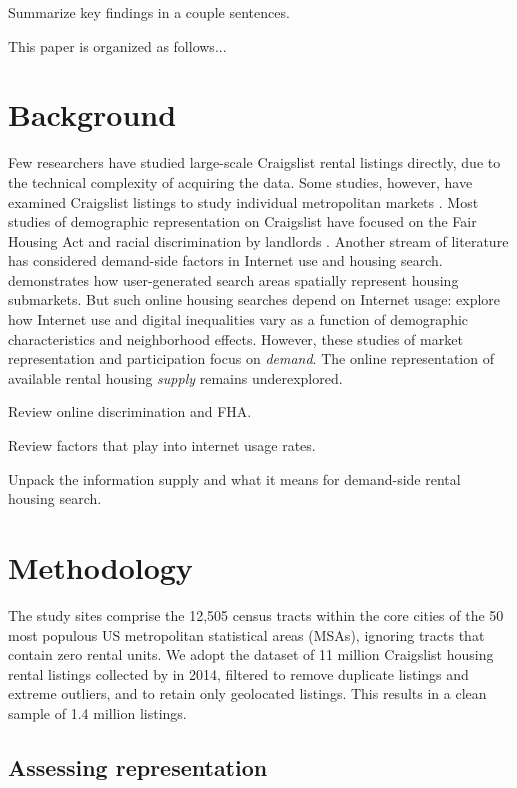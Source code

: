 \documentclass[12pt,onecolumn]{article} %
\begin{document}
Summarize key findings in a couple sentences.

This paper is organized as follows...

\section{Background}

Few researchers have studied large-scale Craigslist rental listings directly, due to the technical complexity of acquiring the data. Some studies, however, have examined Craigslist listings to study individual metropolitan markets \citep[e.g.][]{wegmann_understanding_2012}. Most studies of demographic representation on Craigslist have focused on the Fair Housing Act and racial discrimination by landlords \citep[e.g.][]{decker_housing_2010}. Another stream of literature has considered demand-side factors in Internet use and housing search. \citet{rae_online_2015} demonstrates how user-generated search areas spatially represent housing submarkets. But such online housing searches depend on Internet usage: \citet{mossberger_unraveling_2012} explore how Internet use and digital inequalities vary as a function of demographic characteristics and neighborhood effects. However, these studies of market representation and participation focus on \emph{demand}. The online representation of available rental housing \emph{supply} remains underexplored.

Review online discrimination and FHA.

Review factors that play into internet usage rates.

Unpack the information supply and what it means for demand-side rental housing search.


\section{Methodology}

The study sites comprise the 12,505 census tracts within the core cities of the 50 most populous US metropolitan statistical areas (MSAs), ignoring tracts that contain zero rental units. We adopt the dataset of 11 million Craigslist housing rental listings collected by \citet{boeing_new_2017} in 2014, filtered to remove duplicate listings and extreme outliers, and to retain only geolocated listings. This results in a clean sample of 1.4 million listings.

\subsection{Assessing representation}
\end{document}
